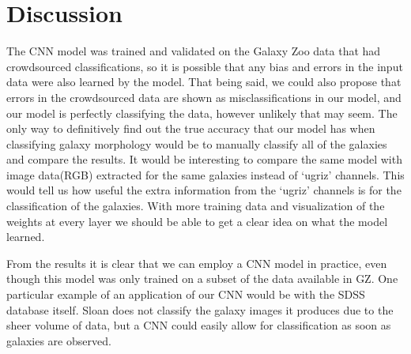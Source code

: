 \section{Discussion}
\label{sec:dis}
The CNN model was trained and validated on the Galaxy Zoo data that had crowdsourced classifications, so it is possible that any bias and errors in the input data were also learned by the model. 
That being said, we could also propose that errors in the crowdsourced data are shown as misclassifications in our model, and our model is perfectly classifying the data, however unlikely that may seem. 
The only way to definitively find out the true accuracy that our model has when classifying galaxy morphology would be to manually classify all of the galaxies and compare the results. 
It would be interesting to compare the same model with image data(RGB) extracted for the same galaxies instead of `ugriz' channels. This would tell us how useful the extra information from the `ugriz' channels is for the classification of the galaxies.
With more training data and visualization of the weights at every layer we should be able to get a clear idea on what the model learned.

From the results it is clear that we can employ a CNN model in practice, even though this model was only trained on a subset of the data available in GZ.
One particular example of an application of our CNN would be with the SDSS database itself. Sloan does not classify the galaxy images it produces due to the sheer volume of data, but a CNN could easily allow for classification as soon as galaxies are observed. 


